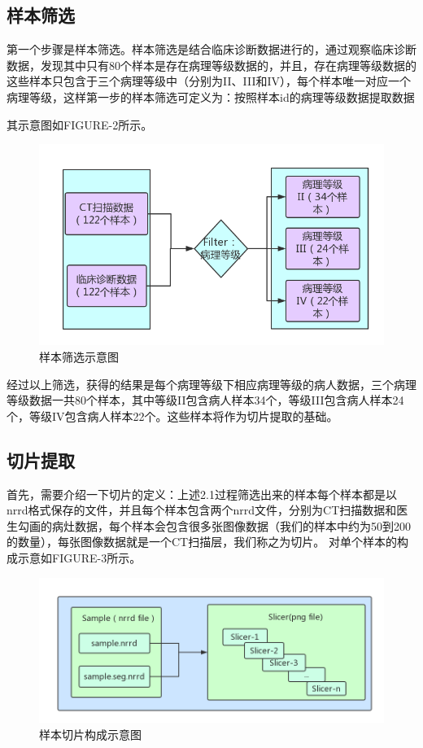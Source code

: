 \documentclass{ctexart}
\begin{document}
\subsection{样本筛选}
第一个步骤是样本筛选。样本筛选是结合临床诊断数据进行的，通过观察临床诊断数据，发现其中只有80个样本是存在病理等级数据的，并且，存在病理等级数据的这些样本只包含于三个病理等级中（分别为II、III和IV），每个样本唯一对应一个病理等级，这样第一步的样本筛选可定义为：按照样本id的病理等级数据提取数据

其示意图如FIGURE-2所示。
\begin{figure}[!htbp] 
\centering
\includegraphics[width=\linewidth]{img/filter1.png} 
\caption{样本筛选示意图}
\label{f2} 
\end{figure}


经过以上筛选，获得的结果是每个病理等级下相应病理等级的病人数据，三个病理等级数据一共80个样本，其中等级II包含病人样本34个，等级III包含病人样本24个，等级IV包含病人样本22个。这些样本将作为切片提取的基础。

\subsection{切片提取}
首先，需要介绍一下切片的定义：上述2.1过程筛选出来的样本每个样本都是以nrrd格式保存的文件，并且每个样本包含两个nrrd文件，分别为CT扫描数据和医生勾画的病灶数据，每个样本会包含很多张图像数据（我们的样本中约为50到200的数量），每张图像数据就是一个CT扫描层，我们称之为切片。 对单个样本的构成示意如FIGURE-3所示。
\begin{figure}[!htbp] 
\centering
\includegraphics[width=\linewidth]{img/sample.png} 
\caption{样本切片构成示意图}
\label{f3} 
\end{figure}
\end{document}
